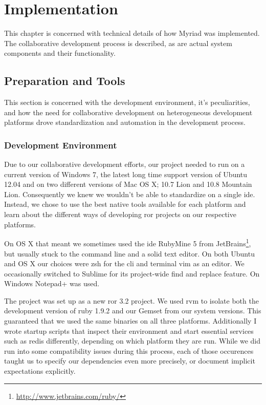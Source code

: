 \chapter{Implementation}
\label{chapter:Implementation}

This chapter is concerned with technical details of how Myriad was implemented. The collaborative development process is described, as are actual system components and their functionality.

\section{Preparation and Tools}

This section is concerned with the development environment, it's peculiarities, and how the need for collaborative development on heterogeneous development platforms drove standardization and automation in the development process.

\subsection{Development Environment}

Due to our collaborative development efforts, our project needed to run on a current version of Windows 7, the latest long time support version of Ubuntu 12.04 and on two different versions of Mac OS X; 10.7 Lion and 10.8 Mountain Lion. Consequently we knew we wouldn't be able to standardize on a single \gls{ide}. Instead, we chose to use the best native tools available for each platform and learn about the different ways of developing \gls{ror} projects on our respective platforms.

On OS X that meant we sometimes used the \gls{ide} RubyMine 5 from JetBrains\footnote{\url{http://www.jetbrains.com/ruby/}}, but usually stuck to the command line and a solid text editor. On both Ubuntu and OS X our choices were \gls{zsh} for the \gls{cli} and terminal \gls{vim} as an editor. We occasionally switched to Sublime for its project-wide find and replace feature. On Windows Notepad+ was used.

The project was set up as a new \gls{ror} 3.2 project. We used \gls{rvm} to isolate both the development version of \gls{ruby} 1.9.2 and our Gemset from our system versions. This guaranteed that we used the same binaries on all three platforms. Additionally I wrote startup scripts that inspect their environment and start essential services such as \gls{redis} differently, depending on which platform they are run. While we did run into some compatibility issues during this process, each of those occurences taught us to specify our dependencies even more precisely, or document implicit expectations explicitly.

